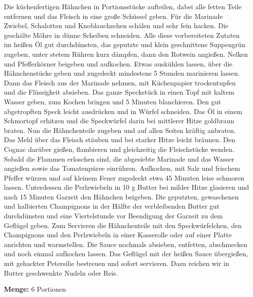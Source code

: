 {Die küchenfertigen Hähnchen in Portionsstücke aufteilen, dabei alle fetten Teile entfernen und das Fleisch in eine große Schüssel geben.  Für die Marinade Zwiebel, Schalotten und Knoblauchzehen schälen und sehr fein hacken. Die geschälte Möhre in dünne Scheiben schneiden. Alle diese vorbereiteten Zutaten im heißen Öl gut durchdünsten, das geputzte und klein geschnittene Suppengrün zugeben, unter stetem Rühren kurz dämpfen, dann den Rotwein angießen. Nelken und Pfefferkörner beigeben und aufkochen. Etwas auskühlen lassen, über die Hähnchenstücke geben und zugedeckt mindestens 5 Stunden marinieren lassen. Dann das Fleisch aus der Marinade nehmen, mit Küchenpapier trockentupfen und die Flüssigkeit absieben. Das ganze Speckstück in einen Topf mit kaltem Wasser geben, zum Kochen bringen und 5 Minuten blanchieren. Den gut abgetropften Speck leicht ausdrücken und in Würfel schneiden. Das Öl in einem Schmortopf erhitzen und die Speckwürfel darin bei mittlerer Hitze goldbraun braten. Nun die Hähnchenteile zugeben und
auf allen Seiten kräftig anbraten. Das Mehl über das Fleisch stäuben und bei starker Hitze leicht bräunen. Den Cognac darüber gießen, flambieren und gleichzeitig die Fleischstücke wenden. Sobald die Flammen erloschen sind, die abgesiebte Marinade und das Wasser angießen sowie das Tomatenpüree einrühren. Aufkochen, mit Salz und frischem Pfeffer würzen und auf kleinem Feuer zugedeckt etwa 45 Minuten leise schmoren lassen. Unterdessen die Perlzwiebeln in 10 g Butter bei milder Hitze glasieren und nach 15 Minuten Garzeit den Hähnchen beigeben. Die geputzten, gewaschenen und halbierten Champignons in der Hälfte der verbleibenden Butter gut durchdünsten und eine Viertelstunde vor Beendigung der Garzeit zu dem Geflügel geben. Zum Servieren die Hähnchenteile mit den Speckwürfelchen, den Champignons und den Perlzwiebeln in einer Kasserolle oder auf einer Platte anrichten und warmstellen. Die Sauce nochmals absieben, entfetten, abschmecken und noch einmal aufkochen lassen. Das Geflügel mit der heißen Sauce übergießen,
mit gehackter Petersilie bestreuen und sofort servieren. Dazu reichen wir in Butter geschwenkte Nudeln oder Reis.


{\bfseries Menge:} 6 Portionen

} 

